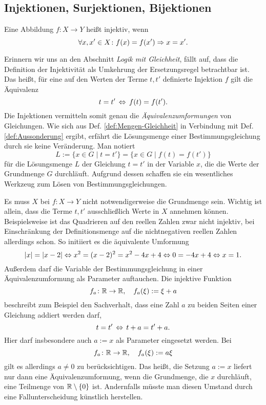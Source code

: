 \newpage
\subsection{Injektionen, Surjektionen, Bijektionen}

\begin{Definition}[Injektion]\label{def:injektiv}\newlinefirst
Eine Abbildung $f\colon X\to Y$ heißt injektiv, wenn%
\[\forall x,x'\in X\colon f(x)=f(x')\Rightarrow x=x'.\]
\end{Definition}

\noindent
Erinnern wir uns an den Abschnitt \emph{Logik mit Gleichheit}, fällt
auf, dass die Definition der Injektivität als Umkehrung der
Ersetzungsregel betrachtbar ist. Das heißt, für eine auf den Werten
der Terme $t,t'$ definierte Injektion $f$ gilt die Äquivalenz%
\[t=t'\, \Leftrightarrow\, f(t)=f(t').\]
Die Injektionen vermitteln somit genau die \emph{Äquivalenzumformungen}%
 von Gleichungen.
Wie sich aus Def. \ref{def:Mengen-Gleichheit} in Verbindung mit
Def. \ref{def:Aussonderung} ergibt, erfährt die Lösungsmenge einer
Bestimmungsgleichung durch sie keine Veränderung. Man notiert%
\[L := \{x\in G\mid t=t'\} = \{x\in G\mid f(t)=f(t')\}\]
für die Lösungsmenge $L$ der Gleichung $t=t'$ in der Variable $x$,
die die Werte der Grundmenge $G$ durchläuft. Aufgrund dessen schaffen
sie ein wesentliches Werkzeug zum Lösen von Bestimmungsgleichungen.

Es muss $X$ bei $f\colon X\to Y$ nicht notwendigerweise die Grundmenge
sein. Wichtig ist allein, dass die Terme $t,t'$ ausschließlich Werte in
$X$ annehmen können. Beispielsweise ist das Quadrieren auf den reellen
Zahlen zwar nicht injektiv, bei Einschränkung der Definitionsmenge auf
die nichtnegativen reellen Zahlen allerdings schon. So initiiert es
die äquivalente Umformung%
\[|x| = |x-2| \Leftrightarrow x^2 = (x-2)^2 = x^2-4x+4 \Leftrightarrow
0 = -4x+4 \Leftrightarrow x = 1.\]
Außerdem darf die Variable der Bestimmungsgleichung in einer
Äquivalenzumformung als Parameter auftauchen. Die injektive Funktion%
\[f_a\colon\mathbb R\to\mathbb R,\quad f_a(\xi) := \xi + a\]
beschreibt zum Beispiel den Sachverhalt, dass eine Zahl $a$ zu beiden
Seiten einer Gleichung addiert werden darf,%
\[t = t'\, \Leftrightarrow\, t + a = t' + a.\]
Hier darf insbesondere auch $a:=x$ als Parameter eingesetzt werden. Bei%
\[f_a\colon\mathbb R\to\mathbb R,\quad f_a(\xi) := a\xi\]
gilt es allerdings $a\ne 0$ zu berücksichtigen. Das heißt, die Setzung
$a:=x$ liefert nur dann eine Äquivalenzumformung, wenn die Grundmenge,
die $x$ durchläuft, eine Teilmenge von $\mathbb R\setminus\{0\}$ ist. Andernfalls
müsste man diesen Umstand durch eine Fallunterscheidung künstlich herstellen.

